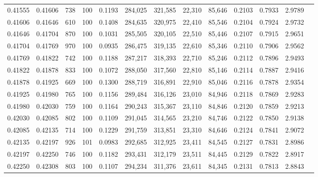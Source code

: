 \begin{tabular}{rrrrrrrrrrrrr}
0.41555 & 0.41606 &   738 & 100 &                                     0.1193 & 284,025 & 321,585 &  22,310 &  85,646 & 0.2103 & 0.7933 & 2.9789 \\
0.41606 & 0.41646 &   610 & 100 &                                     0.1408 & 284,635 & 320,975 &  22,410 &  85,546 & 0.2104 & 0.7924 & 2.9732 \\
0.41646 & 0.41704 &   870 & 100 &                                     0.1031 & 285,505 & 320,105 &  22,510 &  85,446 & 0.2107 & 0.7915 & 2.9651 \\
0.41704 & 0.41769 &   970 & 100 &                                     0.0935 & 286,475 & 319,135 &  22,610 &  85,346 & 0.2110 & 0.7906 & 2.9562 \\
0.41769 & 0.41822 &   742 & 100 &                                     0.1188 & 287,217 & 318,393 &  22,710 &  85,246 & 0.2112 & 0.7896 & 2.9493 \\
0.41822 & 0.41878 &   833 & 100 &                                     0.1072 & 288,050 & 317,560 &  22,810 &  85,146 & 0.2114 & 0.7887 & 2.9416 \\
0.41878 & 0.41925 &   669 & 100 &                                     0.1300 & 288,719 & 316,891 &  22,910 &  85,046 & 0.2116 & 0.7878 & 2.9354 \\
0.41925 & 0.41980 &   765 & 100 &                                     0.1156 & 289,484 & 316,126 &  23,010 &  84,946 & 0.2118 & 0.7869 & 2.9283 \\
0.41980 & 0.42030 &   759 & 100 &                                     0.1164 & 290,243 & 315,367 &  23,110 &  84,846 & 0.2120 & 0.7859 & 2.9213 \\
0.42030 & 0.42085 &   802 & 100 &                                     0.1109 & 291,045 & 314,565 &  23,210 &  84,746 & 0.2122 & 0.7850 & 2.9138 \\
0.42085 & 0.42135 &   714 & 100 &                                     0.1229 & 291,759 & 313,851 &  23,310 &  84,646 & 0.2124 & 0.7841 & 2.9072 \\
0.42135 & 0.42197 &   926 & 101 &                                     0.0983 & 292,685 & 312,925 &  23,411 &  84,545 & 0.2127 & 0.7831 & 2.8986 \\
0.42197 & 0.42250 &   746 & 100 &                                     0.1182 & 293,431 & 312,179 &  23,511 &  84,445 & 0.2129 & 0.7822 & 2.8917 \\
0.42250 & 0.42308 &   803 & 100 &                                     0.1107 & 294,234 & 311,376 &  23,611 &  84,345 & 0.2131 & 0.7813 & 2.8843 \\

\end{tabular}
